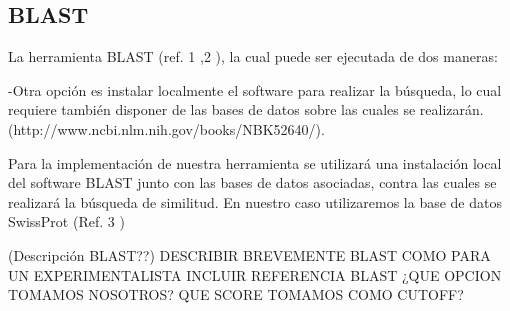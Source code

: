 \subsection{BLAST}\label{blast}

La herramienta BLAST (ref. 1 ,2 ), la cual puede ser ejecutada de dos maneras:

 
    -Otra opción es instalar localmente el software para realizar la búsqueda, lo cual requiere también disponer de las bases de datos sobre las cuales se realizarán. (http://www.ncbi.nlm.nih.gov/books/NBK52640/).

Para la implementación de nuestra herramienta se utilizará una instalación local del software BLAST junto con las bases de datos asociadas, contra las cuales se realizará la búsqueda de similitud. En nuestro caso utilizaremos la base de datos SwissProt (Ref. 3 )

(Descripción BLAST??)
DESCRIBIR BREVEMENTE BLAST COMO PARA UN EXPERIMENTALISTA
INCLUIR REFERENCIA BLAST
¿QUE OPCION TOMAMOS NOSOTROS?
QUE SCORE TOMAMOS COMO CUTOFF?


